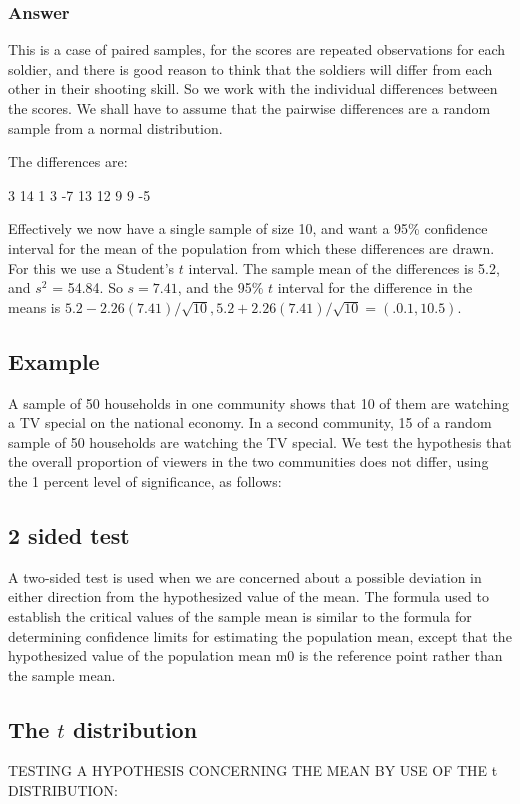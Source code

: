 \subsubsection{Answer}


This is a case of paired samples, for the scores are repeated observations for each
soldier, and there is good reason to think that the soldiers will differ from each other
in their shooting skill. So we work with the individual differences between the scores.
We shall have to assume that the pairwise differences are a random sample from a
normal distribution.

The differences are:

3 14 1 3 -7 13 12 9 9 -5


Effectively we now have a single sample of size 10, and want a 95\% confidence
interval for the mean of the population from which these differences are drawn. For
this we use a Student's $t$ interval. The sample mean of the differences is 5.2, and
$s^2$ = 54.84. So $s = 7.41$, and the 95\% $t$ interval for the difference in the means is
$5.2 - 2.26(7.41)/\sqrt{10},  5.2 + 2.26(7.41)/\sqrt{10} = (.0.1, 10.5)$.

\subsection{Example} A sample of 50 households in one community
shows that 10 of them are watching a TV special on the national
economy. In a second community, 15 of a random sample of 50
households are watching the TV special. We test the hypothesis
that the overall proportion of viewers in the two communities does
not differ, using the 1 percent level of significance, as follows:

\subsection{2 sided test}
A two-sided test is used when we are concerned about a possible
deviation in either direction from the hypothesized value of the
mean. The formula used to establish the critical values of the
sample mean is similar to the formula for determining confidence
limits for estimating the population mean, except that the
hypothesized value of the population mean m0 is the reference
point rather than the sample mean.



\subsection{The $t$ distribution}
TESTING A HYPOTHESIS CONCERNING THE MEAN BY USE OF THE t
DISTRIBUTION:


